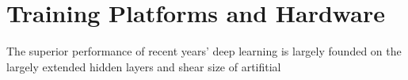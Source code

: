 \section{Training Platforms and Hardware}
The superior performance of recent years' deep learning is largely founded on the largely extended hidden layers and shear size of artifitial 
